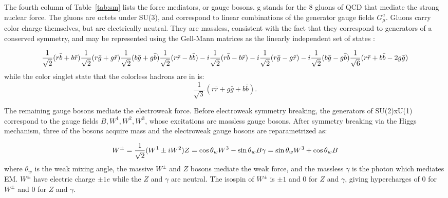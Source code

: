 \indent The fourth column of Table~\ref{tab:sm} lists the force mediators, or gauge bosons. g stands for the 8 gluons of QCD that mediate the strong nuclear force. The gluons are octets under SU(3), and correspond to linear combinations of the generator gauge fields $G^a_\mu$. Gluons carry color charge themselves, but are electrically neutral. They are massless, consistent with the fact that they correspond to generators of a conserved symmetry, and may be represented using the Gell-Mann matrices as the linearly independent set of states \cite{Griffithsqm}:

\begin{equation}
\frac{1}{\sqrt{2}}(r\bar{b} + b\bar{r}) \\
\frac{1}{\sqrt{2}}(r\bar{g} + g\bar{r}) \\
\frac{1}{\sqrt{2}}(b\bar{g} + g\bar{b}) \\
\frac{1}{\sqrt{2}}(r\bar{r} - b\bar{b}) \\
-i \frac{1}{\sqrt{2}}(r\bar{b} - b\bar{r}) \\
-i \frac{1}{\sqrt{2}}(r\bar{g} - g\bar{r}) \\
-i \frac{1}{\sqrt{2}}(b\bar{g} - g\bar{b}) \\
\frac{1}{\sqrt{6}}(r\bar{r} + b\bar{b} -2g\bar{g}) \\
\end{equation}
while the color singlet state that the colorless hadrons are in is:
\begin{equation}
\frac{1}{\sqrt{3}}(r\bar{r} + g\bar{g} + b\bar{b}).
\end{equation}

\indent The remaining gauge bosons mediate the electroweak force. Before electroweak symmetry breaking, the generators of SU(2)xU(1) correspond to the gauge fields $B, W^1, W^2, W^3$, whose excitations are massless gauge bosons. After symmetry breaking via the Higgs mechanism, three of the bosons acquire mass and the electroweak gauge bosons are reparametrized as:

\begin{equation}
W^\pm = \frac{1}{\sqrt{2}}(W^1 \pm iW^2) \\
Z = \cos\theta_w W^3 - \sin\theta_w B \\
\gamma = \sin\theta_w W^3 + \cos\theta_w B \\
\end{equation}
where $\theta_w$ is the weak mixing angle, the massive $W^\pm$ and $Z$ bosons mediate the weak force, and the massless $\gamma$ is the photon which mediates EM. $W^\pm$ have electric charge $\pm 1e$ while the $Z$ and $\gamma$ are neutral. The isospin of $W^\pm$ is $\pm1$ and 0 for $Z$ and $\gamma$, giving hypercharges of $0$ for $W^\pm$ and 0 for $Z$ and $\gamma$. 

